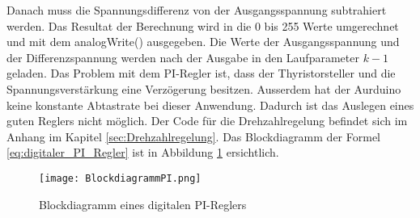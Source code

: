 Danach muss die Spannungsdifferenz von der Ausgangsspannung subtrahiert werden. Das Resultat der Berechnung wird in die 0 bis 255 Werte umgerechnet und mit dem analogWrite() ausgegeben. Die Werte der Ausgangsspannung und der Differenzspannung werden nach der Ausgabe in den Laufparameter $k-1$ geladen. Das Problem mit dem PI-Regler ist, dass der Thyristorsteller und die Spannungsverstärkung eine Verzögerung besitzen. Ausserdem hat der Aurduino keine konstante Abtastrate bei dieser Anwendung. Dadurch ist das Auslegen eines guten Reglers nicht möglich. Der Code für die Drehzahlregelung befindet sich im Anhang im Kapitel \ref{sec:Drehzahlregelung}. Das Blockdiagramm der Formel \ref{eq:digitaler_PI_Regler} ist in Abbildung \ref{fig:PIRegler} ersichtlich.

\begin{figure}[ht!]
	\centering
	\texttt{[image: BlockdiagrammPI.png]}	
	\caption{Blockdiagramm eines digitalen PI-Reglers \cite{PI_Regler}}\label{fig:PIRegler}
\end{figure}







